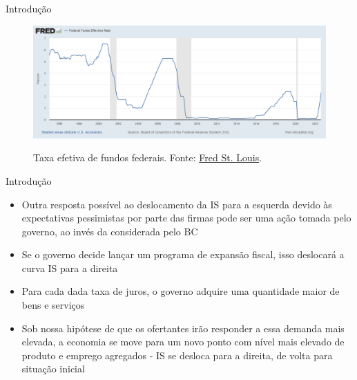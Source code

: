 \documentclass[10pt]{beamer}
\begin{document}
\begin{frame}{Introdução}
    \begin{figure}
        \centering
        \href{https://fred.stlouisfed.org/series/FEDFUNDS}{\includegraphics[width=\textwidth]{./figures/aula6_fig3.png}}
        \caption{Taxa efetiva de fundos federais. Fonte: \href{https://fred.stlouisfed.org/series/FEDFUNDS}{Fred St. Louis}.}
        \label{aula6_fig3}
    \end{figure}
\end{frame}

\begin{frame}{Introdução}
    \begin{itemize}
        \item Outra resposta possível ao deslocamento da IS para a esquerda devido às expectativas pessimistas por parte das firmas pode ser uma ação tomada pelo governo, ao invés da considerada pelo BC\bigskip

        \item Se o governo decide lançar um programa de expansão fiscal, isso deslocará a curva IS para a direita\bigskip

        \item Para cada dada taxa de juros, o governo adquire uma quantidade maior de bens e serviços\bigskip

        \item Sob nossa hipótese de que os ofertantes irão responder a essa demanda mais elevada, a economia se move para um novo ponto com nível mais elevado de produto e emprego agregados - IS se desloca para a direita, de volta para situação inicial
    \end{itemize}
\end{frame}
\end{document}
